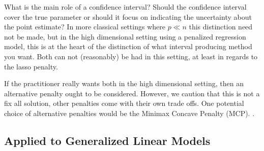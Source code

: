 What is the main role of a confidence interval? Should the confidence interval cover the true parameter or should it focus on indicating the uncertainty about the point estimate? In more classical settings where $p \ll n$ this distinction need not be made, but in the high dimensional setting using a penalized regression model, this is at the heart of the distinction of what interval producing method you want. Both can not (reasonably) be had in this setting, at least in regards to the lasso penalty.

If the practitioner really wants both in the high dimensional setting, then an alternative penalty ought to be considered. However, we caution that this is not a fix all solution, other penalties come with their own trade offs. One potential choice of alternative penalties would be the Minimax Concave Penalty (MCP). .

\subsection{Applied to Generalized Linear Models}


